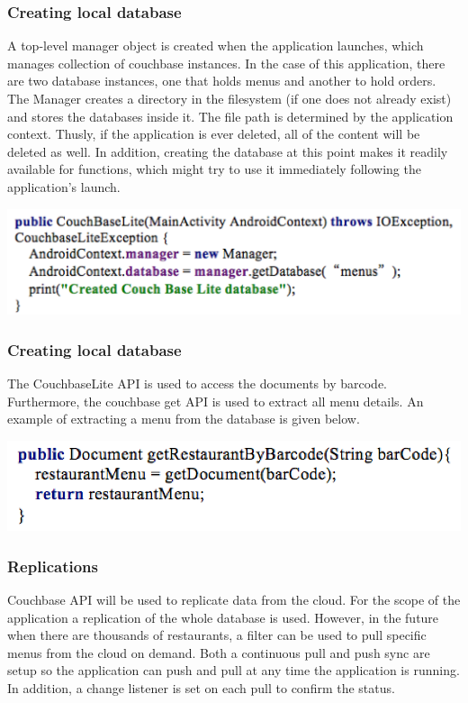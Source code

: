 \documentclass[12pt, titlepage]{article}
\begin{document}
\subsubsection{Creating local database}
A top-level manager object is created when the application launches, which manages collection of couchbase instances. In the case of this application, there are two database instances, one that holds menus and another to hold orders. The Manager creates a directory in the filesystem (if one does not already exist) and stores the databases inside it. The file path is determined by the application context. Thusly, if the application is ever deleted, all of the content will be deleted as well. In addition, creating the database at this point makes it readily available for functions, which might try to use it immediately following the application’s launch. 

\includegraphics[width=150mm,scale=0.5]{createDatabase.png}

\subsubsection{Creating local database}
The CouchbaseLite API is used to access the documents by barcode. Furthermore, the couchbase get API is used to extract all menu details. An example of extracting a menu from the database is given below.

\includegraphics[width=150mm,scale=0.5]{accessdatabase.png}

\subsubsection{Replications}
Couchbase API will be used to replicate data from the cloud. For the scope of the application a replication of the whole database is used. However, in the future when there are thousands of restaurants, a filter can be used to pull specific menus from the cloud on demand. Both a continuous pull and push sync are setup so the application can push and pull at any time the application is running. In addition, a change listener is set on each pull to confirm the status. 
\end{document}
